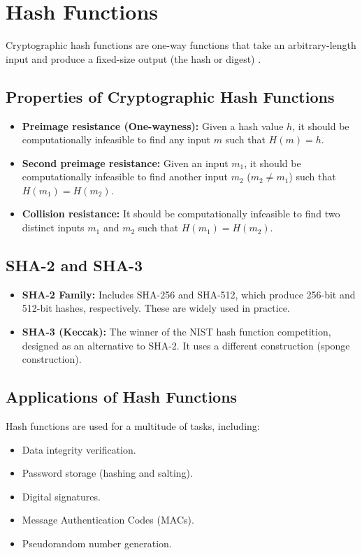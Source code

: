 \documentclass{report}
\begin{document}
\section{Hash Functions}
\label{sec:hash-functions}

Cryptographic hash functions are one-way functions that take an arbitrary-length input and produce a fixed-size output (the hash or digest) \cite{menezes_hash}.

\subsection{Properties of Cryptographic Hash Functions}
\label{subsec:hash-properties}

\begin{itemize}
    \item \textbf{Preimage resistance (One-wayness):} Given a hash value \(h\), it should be computationally infeasible to find any input \(m\) such that \(H(m) = h\).
    \item \textbf{Second preimage resistance:} Given an input \(m_1\), it should be computationally infeasible to find another input \(m_2\) (\(m_2 \neq m_1\)) such that \(H(m_1) = H(m_2)\).
    \item \textbf{Collision resistance:} It should be computationally infeasible to find two distinct inputs \(m_1\) and \(m_2\) such that \(H(m_1) = H(m_2)\).
\end{itemize}

\subsection{SHA-2 and SHA-3}
\label{subsec:sha2-sha3}

\begin{itemize}
    \item \textbf{SHA-2 Family:} Includes SHA-256 and SHA-512, which produce 256-bit and 512-bit hashes, respectively.  These are widely used in practice.
    \item \textbf{SHA-3 (Keccak):}  The winner of the NIST hash function competition, designed as an alternative to SHA-2.  It uses a different construction (sponge construction).
\end{itemize}

\subsection{Applications of Hash Functions}
\label{subsec:hash-applications}
Hash functions are used for a multitude of tasks, including:
\begin{itemize}
    \item Data integrity verification.
    \item Password storage (hashing and salting).
    \item Digital signatures.
    \item Message Authentication Codes (MACs).
    \item Pseudorandom number generation.
\end{itemize}
\end{document}
